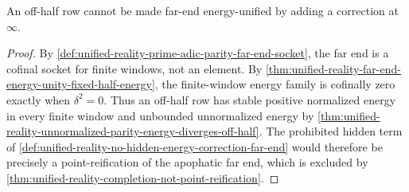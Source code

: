 \begin{corollary}
\label{cor:unified-reality-no-point-at-infinity-absorbs-parity-energy}
An off-half row cannot be made far-end energy-unified by adding a
correction at $\infty$.
\end{corollary}

\begin{proof}
By
\autoref{def:unified-reality-prime-adic-parity-far-end-socket}, the far
end is a cofinal socket for finite windows, not an element.  By
\autoref{thm:unified-reality-far-end-energy-unity-fixed-half-energy}, the
finite-window energy family is cofinally zero exactly when
$\delta^2=0$.  Thus an off-half row has stable positive normalized
energy in every finite window and unbounded unnormalized energy by
\autoref{thm:unified-reality-unnormalized-parity-energy-diverges-off-half}.
The prohibited hidden term of
\autoref{def:unified-reality-no-hidden-energy-correction-far-end} would
therefore be precisely a point-reification of the apophatic far end,
which is excluded by
\autoref{thm:unified-reality-completion-not-point-reification}.
\end{proof}
